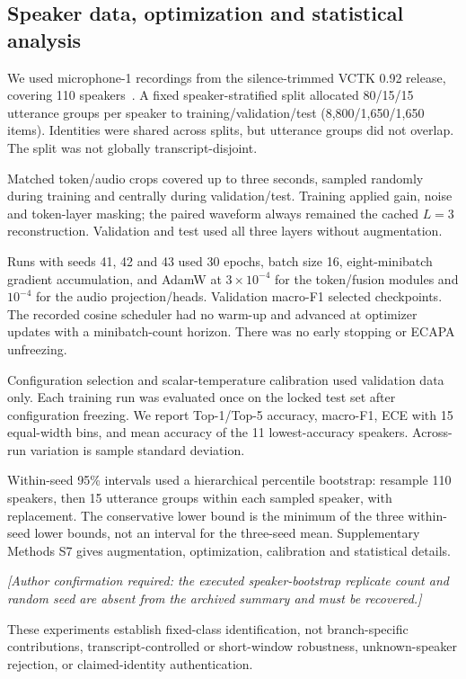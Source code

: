 \documentclass[final,5p,times,twocolumn]{elsarticle}
\begin{document}
\subsection{Speaker data, optimization and statistical analysis}
We used microphone-1 recordings from the silence-trimmed VCTK 0.92 release, covering 110 speakers~\cite{vctk}. A fixed speaker-stratified split allocated 80/15/15 utterance groups per speaker to training/validation/test (8,800/1,650/1,650 items). Identities were shared across splits, but utterance groups did not overlap. The split was not globally transcript-disjoint.

Matched token/audio crops covered up to three seconds, sampled randomly during training and centrally during validation/test. Training applied gain, noise and token-layer masking; the paired waveform always remained the cached $L=3$ reconstruction. Validation and test used all three layers without augmentation.

Runs with seeds 41, 42 and 43 used 30 epochs, batch size 16, eight-minibatch gradient accumulation, and AdamW at $3\times10^{-4}$ for the token/fusion modules and $10^{-4}$ for the audio projection/heads. Validation macro-F1 selected checkpoints. The recorded cosine scheduler had no warm-up and advanced at optimizer updates with a minibatch-count horizon. There was no early stopping or ECAPA unfreezing.

Configuration selection and scalar-temperature calibration used validation data only. Each training run was evaluated once on the locked test set after configuration freezing. We report Top-1/Top-5 accuracy, macro-F1, ECE with 15 equal-width bins, and mean accuracy of the 11 lowest-accuracy speakers. Across-run variation is sample standard deviation.

Within-seed 95\% intervals used a hierarchical percentile bootstrap: resample 110 speakers, then 15 utterance groups within each sampled speaker, with replacement. The conservative lower bound is the minimum of the three within-seed lower bounds, not an interval for the three-seed mean. Supplementary Methods S7 gives augmentation, optimization, calibration and statistical details.

\noindent\textit{[Author confirmation required: the executed speaker-bootstrap replicate count and random seed are absent from the archived summary and must be recovered.]}

These experiments establish fixed-class identification, not branch-specific contributions, transcript-controlled or short-window robustness, unknown-speaker rejection, or claimed-identity authentication.
\end{document}
